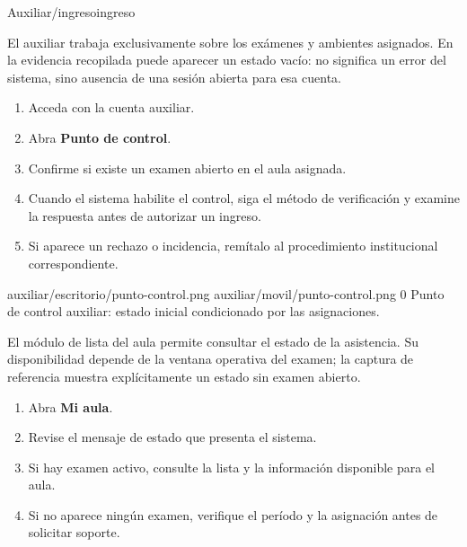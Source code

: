 \documentclass[11pt,a4paper]{article}
\begin{document}
{Auxiliar}{/ingreso}{ingreso}

El auxiliar trabaja exclusivamente sobre los exámenes
y ambientes asignados. En la evidencia recopilada puede
aparecer un estado vacío: no significa un error del sistema,
sino ausencia de una sesión abierta para esa cuenta.

\pasos
\begin{enumerate}
\item Acceda con la cuenta auxiliar.
\item Abra \textbf{Punto de control}.
\item Confirme si existe un examen abierto
en el aula asignada.
\item Cuando el sistema habilite el control,
siga el método de verificación y examine
la respuesta antes de autorizar un ingreso.
\item Si aparece un rechazo o incidencia,
remítalo al procedimiento institucional correspondiente.
\end{enumerate}


\Pantallas
{auxiliar/escritorio/punto-control.png}
{auxiliar/movil/punto-control.png}
{0}
{Punto de control auxiliar: estado inicial condicionado
por las asignaciones.}



El módulo de lista del aula permite consultar
el estado de la asistencia. Su disponibilidad depende
de la ventana operativa del examen; la captura de referencia
muestra explícitamente un estado sin examen abierto.

\pasos
\begin{enumerate}
\item Abra \textbf{Mi aula}.
\item Revise el mensaje de estado que presenta el sistema.
\item Si hay examen activo, consulte la lista
y la información disponible para el aula.
\item Si no aparece ningún examen, verifique el período
y la asignación antes de solicitar soporte.
\end{enumerate}

\end{document}
